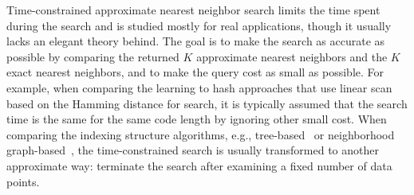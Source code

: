 \documentclass[10pt,journal,compsoc]{IEEEtran}
\begin{document}
Time-constrained approximate nearest neighbor search
limits the time spent during the search
and is studied mostly for real applications,
though it usually lacks an elegant theory behind.
The goal is to make the search as accurate as possible
by comparing the returned $K$ approximate nearest neighbors
and the $K$ exact nearest neighbors,
and to make the query cost as small as possible.
For example,
when comparing the learning to hash approaches
that use linear scan based on the Hamming distance for search,
it is typically assumed that the search time is the same for the same code length
by ignoring other small cost.
When comparing the indexing structure algorithms,
e.g., tree-based~\cite{MujaL09, WangWJLZZH13, MujaL14} or neighborhood graph-based~\cite{WangWZGLG13},
the time-constrained search is usually transformed
to another approximate way:
terminate the search after examining a fixed number of data points.
\end{document}
